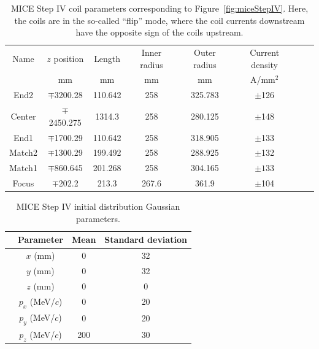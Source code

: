 \begin{table}
\caption[MICE Step IV coil parameters.]{MICE Step IV coil parameters corresponding to Figure~\ref{fig:miceStepIV}. Here, the coils are in the so-called ``flip'' mode, where the coil currents downstream have the opposite sign of the coils upstream.}
\begin{center}
\begin{tabularx}{\textwidth}{cccccccc}
\hline \hline
Name & $z$ position & Length & Inner radius & Outer radius & Current density  \vspace{-12pt}\\
 & mm & mm & mm & mm & A/mm$^2$  \\
\hline
	End2 & $\mp$3200.28&110.642&258&325.783&$\pm$126 \vspace{-12pt}\\
	Center&$\mp$2450.275&1314.3&258&280.125&$\pm$148 \vspace{-12pt}\\
	End1 & $\mp$1700.29& 110.642& 258 & 318.905 & $\pm$133 \vspace{-12pt}\\
	Match2 & $\mp$1300.29 & 199.492 & 258 & 288.925 & $\pm$132 \vspace{-12pt}\\
	Match1 & $\mp$860.645 & 201.268 & 258 & 304.165 & $\pm133$ \vspace{-12pt}\\
	Focus & $\mp$202.2 & 213.3 & 267.6 & 361.9 & $\pm$104 \\ 
\hline
\end{tabularx}
\end{center}
\label{tbl:MICE_coil_parameters}
\end{table}

\begin{table}
\caption{MICE Step IV initial distribution Gaussian parameters.}
\begin{center}
\begin{tabularx}{0.7\textwidth}{p{1cm}ccc}
\hline \hline
&Parameter & Mean & Standard deviation \\
\hline
	&$x$ (mm) & 0 & 32\vspace{-12pt}\\
	&$y$ (mm) & 0 & 32\vspace{-12pt} \\
	&$z$ (mm) & 0 & 0\vspace{-12pt} \\
	&$p_x$ (MeV/$c$) & 0 & 20\vspace{-12pt} \\
	&$p_y$ (MeV/$c$) & 0 & 20\vspace{-12pt} \\
	&$p_z$ (MeV/$c$) & 200 & 30\\
\hline
\end{tabularx}
\end{center}
\label{tbl:MICE_initial_distribution_parameters}
\end{table}

